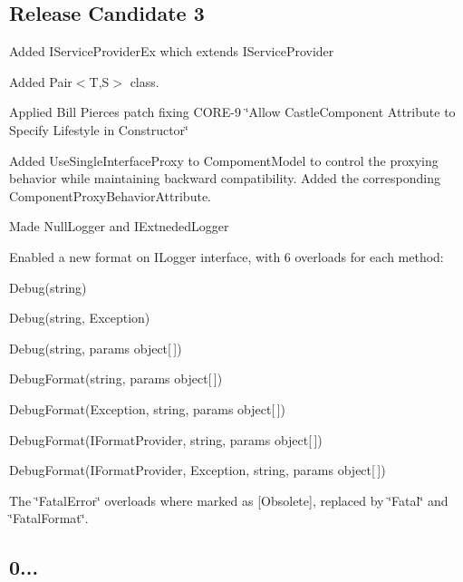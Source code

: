 \subsection*{Release Candidate 3}


\begin{DoxyItemize}
\item Added I\+Service\+Provider\+Ex which extends I\+Service\+Provider
\item Added Pair$<$\+T,\+S$>$ class.
\item Applied Bill Pierce\textquotesingle{}s patch fixing C\+O\+R\+E-\/9 \char`\"{}\+Allow Castle\+Component Attribute to Specify Lifestyle in Constructor\char`\"{}
\item Added Use\+Single\+Interface\+Proxy to Compoment\+Model to control the proxying behavior while maintaining backward compatibility. Added the corresponding Component\+Proxy\+Behavior\+Attribute.
\item Made Null\+Logger and I\+Extneded\+Logger
\item Enabled a new format on I\+Logger interface, with 6 overloads for each method\+:
\begin{DoxyItemize}
\item Debug(string)
\item Debug(string, Exception)
\item Debug(string, params object[$\,$])
\item Debug\+Format(string, params object[$\,$])
\item Debug\+Format(\+Exception, string, params object[$\,$])
\item Debug\+Format(\+I\+Format\+Provider, string, params object[$\,$])
\item Debug\+Format(\+I\+Format\+Provider, Exception, string, params object[$\,$])
\item The \char`\"{}\+Fatal\+Error\char`\"{} overloads where marked as [Obsolete], replaced by \char`\"{}\+Fatal\char`\"{} and \char`\"{}\+Fatal\+Format\char`\"{}.
\end{DoxyItemize}
\end{DoxyItemize}

\subsection*{0...}


